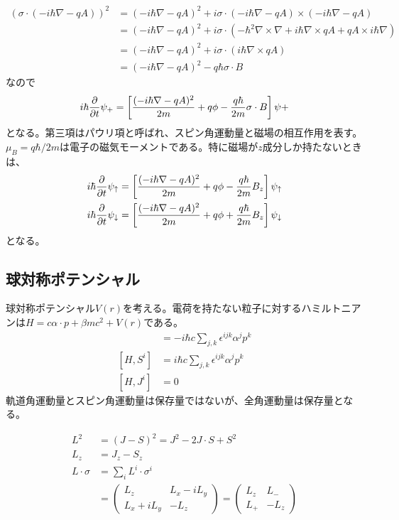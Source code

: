     \begin{align*}
        (\sigma \cdot (-i\hbar\nabla - qA))^2
            &= (-i\hbar\nabla - qA)^2 + i\sigma \cdot (-i\hbar\nabla - qA) \times (-i\hbar\nabla - qA)\\
            &= (-i\hbar\nabla - qA)^2 + i\sigma \cdot (-\hbar^2\nabla \times \nabla + i\hbar\nabla \times qA + qA \times i\hbar\nabla)\\
            &= (-i\hbar\nabla - qA)^2 + i\sigma \cdot (i\hbar\nabla \times qA)\\
            &= (-i\hbar\nabla - qA)^2 - q\hbar \sigma \cdot B
    \end{align*}
    なので
        \[i\hbar\pdv{t}\psi_+ = \left[\frac{(-i\hbar\nabla - qA)^2}{2m} + q\phi - \frac{q\hbar}{2m}\sigma \cdot B\right]\psi+\]
    となる。第三項はパウリ項と呼ばれ、スピン角運動量と磁場の相互作用を表す。$\mu_B = q\hbar / 2m$は電子の磁気モーメントである。特に磁場が$z$成分しか持たないときは、
    \begin{align*}
        i\hbar\pdv{t}\psi_\uparrow &= \left[\frac{(-i\hbar\nabla - qA)^2}{2m} + q\phi - \frac{q\hbar}{2m}B_z\right]\psi_\uparrow\\
        i\hbar\pdv{t}\psi_\downarrow &= \left[\frac{(-i\hbar\nabla - qA)^2}{2m} + q\phi + \frac{q\hbar}{2m}B_z\right]\psi_\downarrow
    \end{align*}
    となる。

\subsection{球対称ポテンシャル}
    球対称ポテンシャル$V(r)$を考える。電荷を持たない粒子に対するハミルトニアンは$H = c\alpha \cdot p + \beta mc^2 + V(r)$である。
    \begin{align*}
        [H, L^i] &= -i\hbar c \sum_{j,k} \epsilon^{ijk}\alpha^jp^k\\
        [H, S^i] &= i\hbar c \sum_{j,k} \epsilon^{ijk}\alpha^jp^k\\
        [H, J^i] &= 0
    \end{align*}
    軌道角運動量とスピン角運動量は保存量ではないが、全角運動量は保存量となる。

    \begin{align*}
        L^2 &= (J - S)^2 = J^2 - 2J \cdot S + S^2\\
        L_z &= J_z - S_z\\
        L \cdot \sigma
            &= \sum_i L^i \cdot \sigma^i\\
            &= \begin{pmatrix}
                L_z & L_x - iL_y\\
                L_x + iL_y & -L_z
            \end{pmatrix}
            = \begin{pmatrix}
                L_z & L_-\\
                L_+ & -L_z
            \end{pmatrix}
    \end{align*}
        
